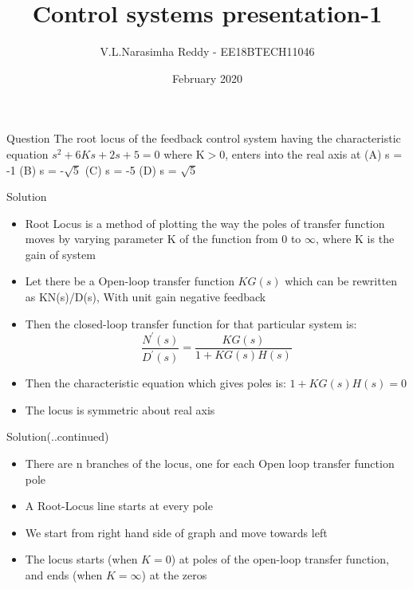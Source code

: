 \documentclass{beamer}
\title{Control systems presentation-1}
\author{V.L.Narasimha Reddy - EE18BTECH11046 }
\date{February 2020}
\begin{document}
\maketitle

\begin{frame}{Question}
The root locus of the feedback control system having the characteristic equation $ s^2 + 6Ks + 2s + 5 = 0 $ where
K$>$0, enters into the real axis at
\bigbreak
(A) s = -1
\bigbreak
(B) s = -$\sqrt{5}$
\bigbreak
(C) s = -5
\bigbreak
(D) s = $\sqrt{5}$
    
\end{frame}
\begin{frame}{Solution}
\begin{itemize}
	\item Root Locus is a method of plotting the way the poles of transfer function moves by varying parameter K of the function from 0 to $\infty$, where K is the gain of system
	\smallskip
    \item Let there be a Open-loop transfer function  $KG(s)$ which can be rewritten as KN(s)/D(s), With unit gain negative feedback 
    \smallskip
    \item Then the closed-loop transfer function for that particular system is:
    $$\frac{N^{'}(s)}{D^{'}(s)}=\frac{K G(s)}{1+K G(s) H(s)}$$
    \item Then the characteristic equation which gives poles is: $1+KG(s)H(s)=0$
    \smallskip
    \item The locus is symmetric about real axis
    \smallskip
    
    
\end{itemize}
    
\end{frame}
\begin{frame}{Solution(..continued)}
\begin{itemize}
    \item There are n branches of the locus, one for each Open loop transfer function pole  
    \medskip
    \item A Root-Locus line starts at every pole
    \medskip
    \item We start from right hand side of graph and move towards left
    \medskip
    \item The locus starts (when $K = 0$) at poles of the open-loop transfer function, and ends (when $K = \infty$) at the zeros
    
\end{itemize}    
\end{frame}
\end{document}

